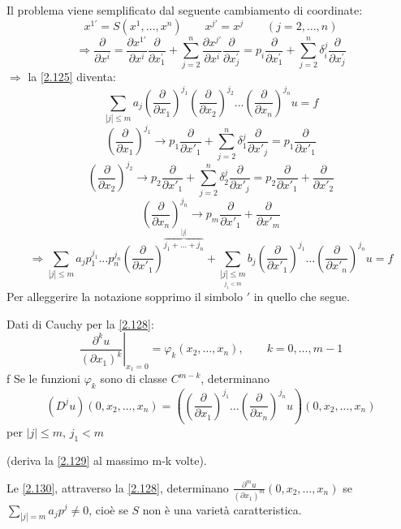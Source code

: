 \documentclass[a4paper,11pt]{report}
\begin{document}
Il problema viene semplificato dal seguente cambiamento di coordinate:
\[
x^{1\prime}=S(x^1,\dots, x^n) \qquad x^{j\prime}=x^j \qquad (j=2,\dots,n)
\]
\[
\Rightarrow \frac{\partial}{\partial x^i} = \frac{\partial x^{1\prime}}{\partial x^i}\frac{\partial}{\partial x^{\prime}_1}+\sum_{j=2}^n \frac{\partial x^{j\prime}}{\partial x^i}\frac{\partial}{\partial x^{\prime}_j}=p_i\frac{\partial}{\partial x^{\prime}_1} + \sum_{j=2}^n \delta_i^j \frac{\partial}{\partial x^{\prime}_j}
\]
$\Rightarrow$ la \eqref{2.125} diventa:
\[
\sum_{|j| \leq m} a_j\left(\frac{\partial}{\partial x_1}\right)^{j_1}\left(\frac{\partial}{\partial x_2}\right)^{j_2} \dots \left(\frac{\partial}{\partial x_n}\right)^{j_n}u=f
\]
\[
\left(\frac{\partial}{\partial x_1}\right)^{j_1} \rightarrow p_1\frac{\partial}{\partial x'_1} + \sum_{j=2}^n \delta^j_1 \frac{\partial}{\partial x'_j} = p_1\frac{\partial}{\partial x'_1}
\]
\[
\left(\frac{\partial}{\partial x_2}\right)^{j_2} \rightarrow p_2\frac{\partial}{\partial x'_1} + \sum_{j=2}^n \delta^j_2 \frac{\partial}{\partial x'_j} = p_2\frac{\partial}{\partial x'_1} + \frac{\partial}{\partial x'_2}
\]
\[
\left(\frac{\partial}{\partial x_n}\right)^{j_n} \rightarrow p_m \frac{\partial}{\partial x'_1} + \frac{\partial}{\partial x'_m}
\]
\begin{equation}
\Rightarrow \sum_{|j|\leq m} a_j p_1^{j_1}\dots p_n^{j_n}\left(\frac{\partial}{\partial x'_1}\right)^{\overbrace{j_1 + \dots  + j_n}^{|j|}} + \sum_{\underset{j_1<m}{|j|\leq m}}b_j\left(\frac{\partial}{\partial x'_1}\right)^{j_1} \dots \left(\frac{\partial}{\partial x'_n}\right)^{j_n}u=f
\label{2.128}
\end{equation}
Per alleggerire la notazione sopprimo il simbolo $'$ in quello che segue.

Dati di Cauchy per la \eqref{2.128}:
\begin{equation}
\left.\frac{\partial^k u}{(\partial x_1)^k}\right|_{x_1=0}=\varphi_k(x_2,\dots, x_n) , \qquad k=0,\dots,m-1
\label{2.129}
\end{equation}f
Se le funzioni $\varphi_k$ sono di classe $C^{m-k}$, determinano 
\begin{equation}
(D^j u)(0,x_2,\dots,x_n)=\left(\left(\frac{\partial}{\partial x_1}\right)^{j_1}\dots \left(\frac{\partial}{\partial x_n}\right)^{j_n}u\right)(0,x_2,\dots,x_n)
\label{2.130}
\end{equation}
per $|j|\leq m$, $j_1<m$ 

(deriva la \eqref{2.129} al massimo m-k volte).

Le \eqref{2.130}, attraverso la \eqref{2.128}, determinano $ \frac{\partial^m u}{(\partial x_1)^m} (0,x_2,\dots, x_n) $ se $ \sum_{|j|=m} a_j p^j \neq 0 $, cio\`e se $S$ non \`e una variet\`a caratteristica. 
\end{document}

